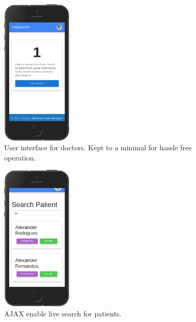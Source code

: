 \documentclass[12pt]{article}
\begin{document}
\begin{figure}[ht]
\centering
\includegraphics[width=0.3\textwidth]{6se.png}
\caption{\label{fig:55} User interface for doctors. Kept to a minimal for hassle free operation.}
\end{figure}
\begin{figure}[ht]
\centering
\includegraphics[width=0.3\textwidth]{7se.png}
\caption{\label{fig:56} AJAX enable live search for patients.}
\end{figure}
\end{document}
